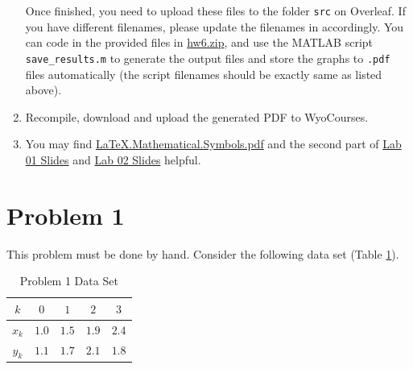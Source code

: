 \begin{enumerate}[label={\arabic*.}]
    Once finished, you need to upload these files to the folder \verb|src| on Overleaf. If you have different filenames, please update the filenames in \verb|| accordingly. You can code in the provided files in \href{https://libaoj.in/courses/2020f/MATH3340/Homework/6/hw6.zip}{hw6.zip}, and use the MATLAB script \verb|save_results.m| to generate the output files and store the graphs to \verb|.pdf| files automatically (the script filenames should be exactly same as listed above).
  \item Recompile, download and upload the generated PDF to WyoCourses.
  \item You may find \href{https://libaoj.in/files/LaTeX.Mathematical.Symbols.pdf}{\LaTeX{}.Mathematical.Symbols.pdf} and the second part of \href{https://libaoj.in/courses/2020f/MATH3341/slides/Math.3341.Lab.01.Slides.pdf}{Lab 01 Slides} and \href{https://libaoj.in/courses/2020f/MATH3341/slides/Math.3341.Lab.02.Slides.pdf}{Lab 02 Slides} helpful.
\end{enumerate}
\newpage

\section{Problem 1}%
\label{sec:problem_1}
This problem must be done by hand. Consider the following data set (Table \ref{tab:1data}).
\begin{table}[!hbtp]
  \centering
  \caption{Problem 1 Data Set}
  \label{tab:1data}
  \begin{tabular}{ccccc}
    \toprule
    $k$ & $0$ & $1$ & $2$ & $3$             \\
    \midrule
    $x_{k}$ & $1.0$ & $1.5$ & $1.9$ & $2.4$ \\
    $y_{k}$ & $1.1$ & $1.7$ & $2.1$ & $1.8$ \\
    \bottomrule
  \end{tabular}
\end{table}

